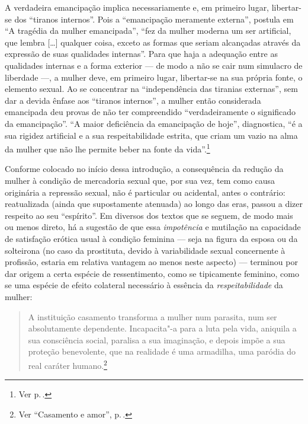 A verdadeira emancipação implica necessariamente e, em primeiro lugar,
libertar-se dos ``tiranos internos''. Pois a ``emancipação meramente
externa'', postula em ``A tragédia da mulher emancipada'', ``fez da
mulher moderna um ser artificial, que lembra {[}\ldots{]} qualquer coisa,
exceto as formas que seriam alcançadas através da expressão de suas
qualidades internas''. Para que haja a adequação entre as qualidades
internas e a forma exterior --- de modo a não se cair num simulacro de
liberdade ---, a mulher deve, em primeiro lugar, libertar-se na sua
própria fonte, o elemento sexual. Ao se concentrar na ``independência
das tiranias externas'', sem dar a devida ênfase aos ``tiranos
internos'', a mulher então considerada emancipada deu
provas de não ter compreendido ``verdadeiramente o significado da
emancipação''. ``A maior deficiência da emancipação de hoje'',
diagnostica, ``é a sua rigidez artificial e a sua respeitabilidade
estrita, que criam um vazio na alma da mulher que não lhe permite beber
na fonte da vida''.\footnote{Ver p.\,\pageref{mae}.}

Conforme colocado no início dessa introdução, a consequência da
redução da mulher à condição de mercadoria sexual que, por sua vez, tem
como causa originária a repressão sexual, não é particular ou acidental,
antes o contrário: reatualizada (ainda que supostamente atenuada) ao
longo das eras, passou a dizer respeito ao seu ``espírito''. Em diversos
dos textos que se seguem, de modo mais ou menos direto, há a sugestão de
que essa \textit{impotência} e mutilação na capacidade de satisfação erótica
usual à condição feminina --- seja na figura da esposa ou da solteirona
(no caso da prostituta, devido à variabilidade sexual concernente à
profissão, estaria em relativa vantagem ao menos neste aspecto) ---
terminou por dar origem a certa espécie de ressentimento, como se
tipicamente feminino, como se uma espécie de efeito colateral necessário
à essência da \textit{respeitabilidade} da mulher:

\begin{quote}
A instituição casamento transforma a mulher num parasita, num ser
absolutamente dependente. Incapacita"-a para a luta pela vida, aniquila a
sua consciência social, paralisa a sua imaginação, e depois impõe a sua
proteção benevolente, que na realidade é uma armadilha, uma paródia do
real caráter humano.\footnote{Ver ``Casamento e amor'', p.\,\pageref{parasita}.}
\end{quote}

